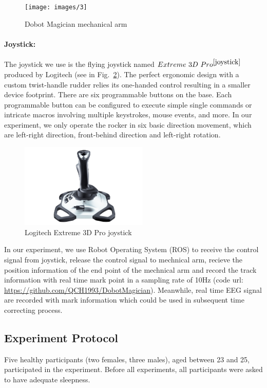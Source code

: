 \documentclass[runningheads,a4paper]{llncs}
\begin{document}
\begin{figure}
    \centering
    \texttt{[image: images/3]}
    \caption{Dobot Magician mechanical arm}
    \label{fig:dobot}
\end{figure}

\paragraph{Joystick:}
The joystick we use is the flying joystick named $Extreme\ 3D\ Pro^{\cite{joystick}}$
produced by Logitech (see in Fig.~\ref{fig:joystick}).
The perfect ergonomic design with a custom twist-handle rudder relies
its one-handed control resulting in a smaller device footprint.
There are six programmable buttons on the base.
Each programmable button can be configured to execute simple single commands or
intricate macros involving multiple keystrokes, mouse events, and more.
In our experiment, we only operate the rocker in six basic direction movement,
which are left-right direction, front-behind direction and left-right rotation.

\begin{figure}
    \centering
    \includegraphics[height=4cm]{images/4}
    \caption{Logitech Extreme 3D Pro joystick}
    \label{fig:joystick}
\end{figure}

In our experiment, we use Robot Operating System (ROS) to receive the control
signal from joystick, release the control signal to mechnical arm, recieve the
position information of the end point of the mechnical arm and record the track
information with real time mark point in a sampling rate of 10Hz
(code url: \url{https://github.com/QCH1993/DobotMagician}). Meanwhile,
real time EEG signal are recorded with mark information which could be used in
subsequent time correcting process.

\subsection{Experiment Protocol}
Five healthy participants (two females, three males), aged between 23 and 25,
participated in the experiment. Before all experiments, all participants were
asked to have adequate sleepness.
\end{document}
